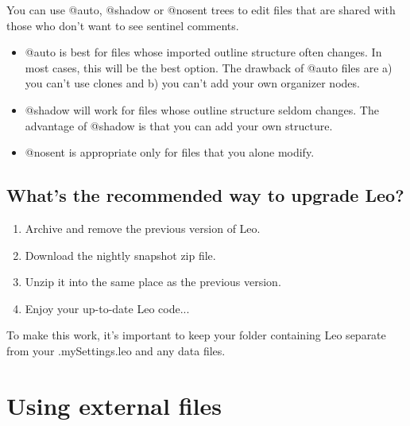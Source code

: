 \documentclass[a4paper,10pt,english]{sphinxmanual}
\begin{document}
You can use @auto, @shadow or @nosent trees to edit
files that are shared with those who don't want to see sentinel comments.
\begin{itemize}
\item {} 
@auto is best for files whose imported outline structure often changes. In
most cases, this will be the best option. The drawback of @auto files are a)
you can't use clones and b) you can't add your own organizer nodes.

\item {} 
@shadow will work for files whose outline structure seldom changes.
The advantage of @shadow is that you can add your own structure.

\item {} 
@nosent is appropriate only for files that you alone modify.

\end{itemize}


\subsection{What's the recommended way to upgrade Leo?}
\label{FAQ:what-s-the-recommended-way-to-upgrade-leo}\begin{enumerate}
\item {} 
Archive and remove the previous version of Leo.

\item {} 
Download the nightly snapshot zip file.

\item {} 
Unzip it into the same place as the previous version.

\item {} 
Enjoy your up-to-date Leo code...

\end{enumerate}

To make this work, it's important to keep your folder containing Leo
separate from your .mySettings.leo and any data files.


\section{Using external files}
\label{FAQ:using-external-files}
\end{document}
